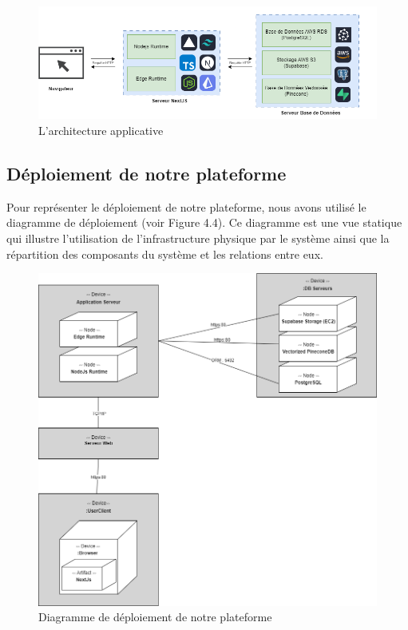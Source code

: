 \begin{figure}[H]
    \centering
    \includegraphics[width=1.15\textwidth, height=0.5\textwidth]{images/chp4/fig3.png}
    \caption{L’architecture applicative}
    \label{fig:architecture-applicative}    
\end{figure}

\subsection{Déploiement de notre plateforme}
Pour représenter le déploiement de notre plateforme, nous avons utilisé le diagramme de déploiement (voir Figure 4.4). Ce diagramme est une vue statique qui illustre l'utilisation de l'infrastructure physique par le système ainsi que la  répartition des composants du système et les relations entre eux.
\begin{figure}[H]
    \centering
    \includegraphics[width=\textwidth,height=0.8\textwidth]{images/chp4/fig4.png}
    \caption{Diagramme de déploiement de notre plateforme}
    \label{fig:Diagramme de déploiement de notre plateforme}    
\end{figure}

